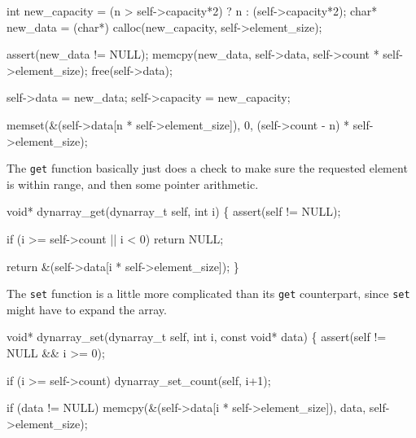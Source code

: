 \nwenddocs{}\endmoddef
int   new_capacity = (n > self->capacity*2) ? n : (self->capacity*2);
char* new_data     = (char*) calloc(new_capacity, self->element_size);

assert(new_data != NULL);
memcpy(new_data, self->data, self->count * self->element_size);
free(self->data);

self->data = new_data;
self->capacity = new_capacity;
\nwendcode{}\nwdocspar

\nwenddocs{}\endmoddef
memset(&(self->data[n * self->element_size]), 0, 
        (self->count - n) * self->element_size);
\nwendcode{}\nwdocspar

The {\tt{}get} function basically just does a check to make sure
the requested element is within range, and then some pointer
arithmetic.

\nwenddocs{}\plusendmoddef
void* dynarray_get(dynarray_t self, int i)
\{
    assert(self != NULL);

    if (i >= self->count || i < 0)
        return NULL;

    return &(self->data[i * self->element_size]);
\}

\nwendcode{}\nwdocspar

The {\tt{}set} function is a little more complicated than its
{\tt{}get} counterpart, since {\tt{}set} might have to expand the
array.

\nwenddocs{}\plusendmoddef
void* dynarray_set(dynarray_t self, int i, const void* data)
\{
    assert(self != NULL && i >= 0);

    if (i >= self->count)
        dynarray_set_count(self, i+1);

    if (data != NULL)
        memcpy(&(self->data[i * self->element_size]), data, 
               self->element_size);

